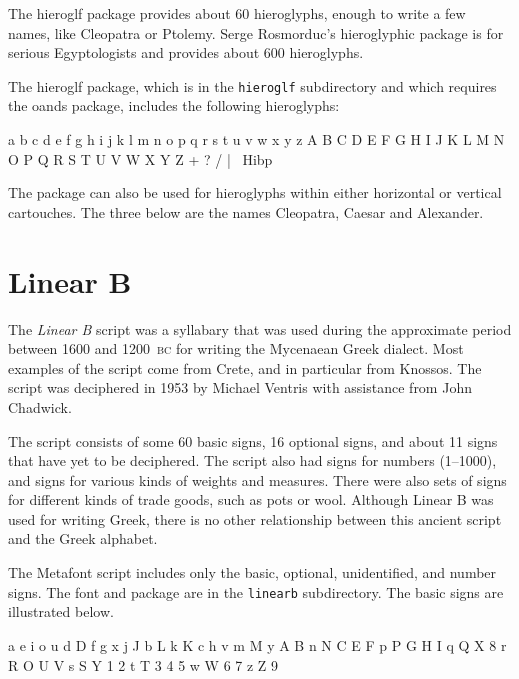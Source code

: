 \documentclass{article}
\newcommand{\BC}{\textsc{bc}}
\begin{document}
    The hieroglf package provides about 60 hieroglyphs, enough to
write a few names, like Cleopatra or Ptolemy. Serge Rosmorduc's
hieroglyphic package is for serious Egyptologists and provides about
600 hieroglyphs.

    The hieroglf package, which is in the \texttt{hieroglf} subdirectory and
which requires the oands package, includes the following hieroglyphs:

\begin{center}
\renewcommand{\baselinestretch}{1.2}
\pmhgfamily
a b c d e f g h i j k l m n o p q r s t u v w x y z
A B C D E F G H I J K L M N O P Q R S T U V W X Y Z
+ ? / | \Hms\ Hibp\ \Hibw\ \Hibs\ \Hibl\ \Hsv
\end{center}

    The package can also be used for hieroglyphs within either
horizontal or vertical cartouches. The three below are the
names Cleopatra, Caesar and Alexander.

\begin{center}
\renewcommand{\baselinestretch}{1.2}
\end{center}

\section{Linear B}

    The \textit{Linear B} script was a syllabary that was used during the 
approximate period between 1600 and 1200~\BC{} for writing the Mycenaean Greek
dialect. Most examples of the script come from Crete, and in particular from
Knossos. The script was deciphered in 1953 by Michael Ventris with assistance
from John Chadwick.

    The script consists of some 60 basic signs, 16 optional signs, and about
11 signs that have yet to be deciphered. The script also had signs for numbers
(1--1000), and signs for various kinds of weights and measures. There were
also sets of signs for different kinds of trade goods, such as pots or wool.
Although Linear B was used for writing Greek, there is no other relationship
between this ancient script and the Greek alphabet.

    The Metafont script includes only the basic, optional, unidentified,
and number signs. The font and package are in the \texttt{linearb}
subdirectory. The basic signs are illustrated below.

\begin{center}
\renewcommand{\baselinestretch}{1.2}
\linbfamily
a e i o u 
d D f g x 
j J b L
k K c h v
m M y A B
n N C E F
p P G H I
q Q X 8
r R O U V
s S Y 1 2
t T 3 4 5
w W 6 7
z Z 9

\end{center}
\end{document}
